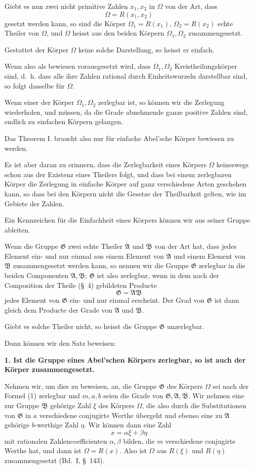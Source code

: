 \documentclass[11pt]{article}
\newcommand{\Om}{\Omega}
\newcommand{\Gg}{\mathfrak G}
\newcommand{\Aa}{\mathfrak A}
\newcommand{\Bb}{\mathfrak B}
\begin{document}
Giebt es nun zwei nicht primitive Zahlen $x_1,x_2$ in $\Om$ von der Art, dass
\[
  \Om=R(x_1,x_2)
\]
gesetzt werden kann, so sind die Körper $\Om_1=R(x_1)$, $\Om_2=R(x_2)$ echte Theiler von $\Om$, und $\Om$ heisst aus den beiden Körpern $\Om_1,\Om_2$ zusammengesetzt.

Gestattet der Körper $\Om$ keine solche Darstellung, so heisst er einfach.

Wenn also als bewiesen vorausgesetzt wird, dass $\Om_1,\Om_2$ Kreistheilungskörper sind, d.~h. dass alle ihre Zahlen rational durch Einheitswurzeln darstellbar sind, so folgt dasselbe für $\Om$.

Wenn einer der Körper $\Om_1,\Om_2$ zerlegbar ist, so können wir die Zerlegung wiederholen, und müssen, da die Grade abnehmende ganze positive Zahlen sind, endlich zu einfachen Körpern gelangen.

Das Theorem I. braucht also nur für einfache Abel'sche Körper bewiesen zu werden.

Es ist aber daran zu erinnern, dass die Zerlegbarkeit eines Körpers $\Om$ keineswegs schon aus der Existenz eines Theilers folgt, und dass bei einem zerlegbaren Körper die Zerlegung in einfache Körper auf ganz verschiedene Arten geschehen kann, so dass bei den Körpern nicht die Gesetze der Theilbarkeit gelten, wie im Gebiete der Zahlen.

Ein Kennzeichen für die Einfachheit eines Körpers können wir aus seiner Gruppe ableiten.

Wenn die Gruppe $\Gg$ zwei echte Theiler $\Aa$ und $\Bb$ von der Art hat, dass jedes Element ein- und nur einmal aus einem Element von $\Aa$ und einem Element von $\Bb$ zusammengesetzt werden kann, so nennen wir die Gruppe $\Gg$ zerlegbar in die beiden Componenten $\Aa,\Bb$; $\Gg$ ist also zerlegbar, wenn in dem nach der Composition der Theile (\S~4) gebildeten Producte
\begin{equation}
  \Gg=\Aa\Bb
\tag{1}
\end{equation}
jedes Element von $\Gg$ ein- und nur einmal erscheint. Der Grad von $\Gg$ ist dann gleich dem Producte der Grade von $\Aa$ und $\Bb$.

Giebt es solche Theiler nicht, so heisst die Gruppe $\Gg$ unzerlegbar.

Dann können wir den Satz beweisen:

\textbf{1. Ist die Gruppe eines Abel'schen Körpers zerlegbar, so ist auch der Körper zusammengesetzt.}

Nehmen wir, um dies zu beweisen, an, die Gruppe $\Gg$ des Körpers $\Om$ sei nach der Formel (1) zerlegbar und $m,a,b$ seien die Grade von $\Gg,\Aa,\Bb$. Wir nehmen eine zur Gruppe $\Bb$ gehörige Zahl $\xi$ des Körpers $\Om$, die also durch die Substitutionen von $\Gg$ in $a$ verschiedene conjugirte Werthe übergeht und ebenso eine zu $\Aa$ gehörige $b$-werthige Zahl $\eta$. Wir können dann eine Zahl
\[
  x=\alpha\xi+\beta\eta
\]
mit rationalen Zahlencoefficienten $\alpha,\beta$ bilden, die $m$ verschiedene conjugirte Werthe hat, und dann ist $\Om=R(x)$. Also ist $\Om$ aus $R(\xi)$ und $R(\eta)$ zusammengesetzt (Bd.~I, \S~143).
\end{document}
